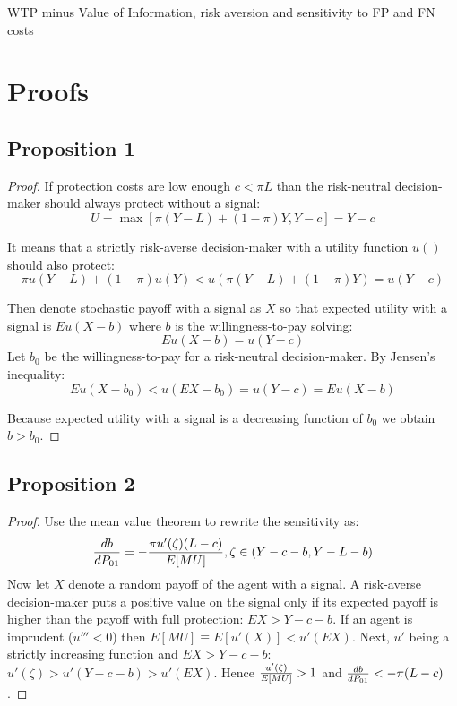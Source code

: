 \documentclass[12pt,a4paper]{article}
\begin{document}
 \label{ip_tab}

 \label{wtp_dem}


\begin{table}[h!]
\caption{WTP minus Value of Information, risk aversion and sensitivity to FP and FN costs} \label{tab:wtp_risk}

\end{table}

%
%
%





\newpage
\section{Proofs}
\small

\subsection{Proposition 1}
\begin{proof} If protection costs are low enough $c<\pi L$ than the risk-neutral decision-maker should always protect without a signal:
$$U=\max[\pi(Y-L)+(1-\pi)Y,Y-c]=Y-c$$

It means that a strictly risk-averse decision-maker with a utility function $u()$ should also protect:
$$\pi u(Y-L)+(1-\pi)u(Y)<u(\pi(Y-L)+(1-\pi)Y)=u(Y-c)$$

Then denote stochastic payoff with a signal as $X$ so that expected utility with a signal is $Eu(X-b)$ where $b$ is the willingness-to-pay solving:
$$Eu(X-b)=u(Y-c)$$
 Let $b_0$ be the willingness-to-pay for a risk-neutral decision-maker. By Jensen's inequality:
$$Eu(X-b_0)<u(EX-b_0)=u(Y-c)=Eu(X-b)$$

Because expected utility with a signal is a decreasing function of $b_0$ we obtain $b>b_0$. \end{proof} 

\subsection{Proposition 2}
\begin{proof}
Use the mean value theorem to rewrite the sensitivity as:
$${db\over dP_{01}}=-{\pi u'(\zeta)(L-c)\over E[MU]},\zeta \in \left(Y-c-b, Y-L-b\right)$$
Now let $X$ denote a random payoff of the agent with a signal. A risk-averse decision-maker puts a positive value on the signal only if its expected payoff is higher than the payoff with full protection: $EX>Y-c-b$. If an agent is imprudent ($u'''<0$) then $E[MU]\equiv E[u'(X)]<u'(EX)$. Next, $u'$ being a strictly increasing function and $EX>Y-c-b$: $u'(\zeta)>u'(Y-c-b)>u'(EX)$. Hence ${u'(\zeta)\over E[MU]}>1$ and ${db\over dP_{01}}<-\pi(L-c)$. 
\end{proof}
\end{document}
